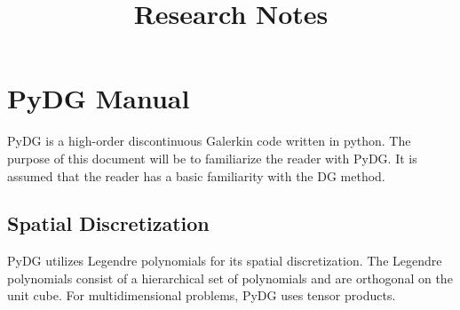 \documentclass[times,12pt]{article}%
\title{Research Notes}
\begin{document}
\section{PyDG Manual}
PyDG is a high-order discontinuous Galerkin code written in python. The purpose of this document will be to familiarize the reader with PyDG. It is assumed that the reader has a basic familiarity with the DG method.

\subsection{Spatial Discretization}
PyDG utilizes Legendre polynomials for its spatial discretization. The Legendre polynomials consist of a hierarchical set of polynomials and are orthogonal on the unit cube. For multidimensional problems, PyDG uses tensor products.
\end{document}
